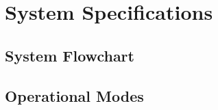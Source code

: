 \documentclass[../../main.tex]{subfiles}
\begin{document}
\chapter{System Specifications}
\thispagestyle{fancy}


\section{System Flowchart}
\blindtext


\section{Operational Modes}
\blindtext
\end{document}
